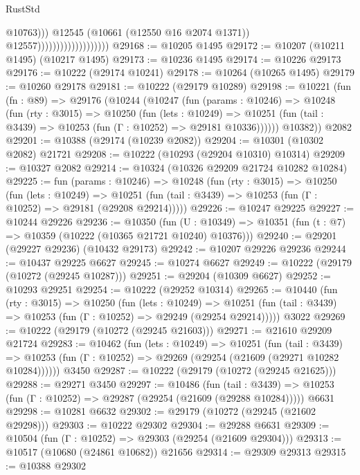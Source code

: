 \begin{lexlean}{RustStd}
\begin{coremodule}
                                                @10763)))
                                          @12545
                                          (@10661 (@12550 @16 @2074 @1371))
                                          @12557)))))))))))))))))))
@29168 := @10205 @1495
@29172 := @10207 (@10211 @1495) (@10217 @1495)
@29173 := @10236 @1495
@29174 := @10226 @29173
@29176 := @10222 (@29174 @10241)
@29178 := @10264 (@10265 @1495)
@29179 := @10260 @29178
@29181 := @10222 (@29179 @10289)
@29198 := @10221
    (fun (fn : @89) =>
    @29176
      (@10244
        (@10247
          (fun (params : @10246) =>
          @10248
            (fun (rty : @3015) =>
            @10250
              (fun (lets : @10249) =>
              @10251 (fun (tail : @3439) => @10253 (fun (Γ : @10252) => @29181 @10336))))))
        @10382))
    @2082
@29201 := @10388 (@29174 (@10239 @2082))
@29204 := @10301 (@10302 @2082) @21721
@29208 := @10222 (@10293 (@29204 @10310) @10314)
@29209 := @10327 @2082
@29214 := @10324 (@10326 @29209 @21724 @10282 @10284)
@29225 := fun (params : @10246) =>
  @10248
    (fun (rty : @3015) =>
    @10250
      (fun (lets : @10249) =>
      @10251 (fun (tail : @3439) => @10253 (fun (Γ : @10252) => @29181 (@29208 @29214)))))
@29226 := @10247 @29225
@29227 := @10244 @29226
@29236 := @10350
    (fun (U : @10349) => @10351 (fun (t : @7) => @10359 (@10222 (@10365 @21721 @10240) @10376)))
@29240 := @29201 (@29227 @29236) (@10432 @29173)
@29242 := @10207 @29226 @29236
@29244 := @10437 @29225 @6627
@29245 := @10274 @6627
@29249 := @10222 (@29179 (@10272 (@29245 @10287)))
@29251 := @29204 (@10309 @6627)
@29252 := @10293 @29251
@29254 := @10222 (@29252 @10314)
@29265 := @10440
    (fun (rty : @3015) =>
    @10250
      (fun (lets : @10249) =>
      @10251 (fun (tail : @3439) => @10253 (fun (Γ : @10252) => @29249 (@29254 @29214)))))
    @3022
@29269 := @10222 (@29179 (@10272 (@29245 @21603)))
@29271 := @21610 @29209 @21724
@29283 := @10462
    (fun (lets : @10249) =>
    @10251
      (fun (tail : @3439) =>
      @10253 (fun (Γ : @10252) => @29269 (@29254 (@21609 (@29271 @10282 @10284))))))
    @3450
@29287 := @10222 (@29179 (@10272 (@29245 @21625)))
@29288 := @29271 @3450
@29297 := @10486
    (fun (tail : @3439) => @10253 (fun (Γ : @10252) => @29287 (@29254 (@21609 (@29288 @10284)))))
    @6631
@29298 := @10281 @6632
@29302 := @29179 (@10272 (@29245 (@21602 @29298)))
@29303 := @10222 @29302
@29304 := @29288 @6631
@29309 := @10504 (fun (Γ : @10252) => @29303 (@29254 (@21609 @29304)))
@29313 := @10517 (@10680 (@24861 @10682)) @21656
@29314 := @29309 @29313
@29315 := @10388 @29302

\end{coremodule}
\end{lexlean}
